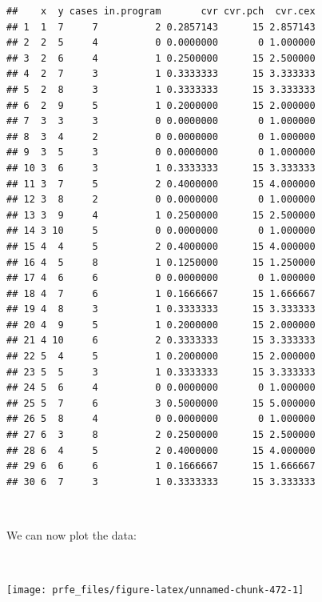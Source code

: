 \documentclass[12pt,a4paper]{book}
\newenvironment{Shaded}{\begin{snugshade}}{\end{snugshade}}
\newcommand{\DataTypeTok}[1]{\textcolor[rgb]{0.13,0.29,0.53}{#1}}
\newcommand{\KeywordTok}[1]{\textcolor[rgb]{0.13,0.29,0.53}{\textbf{#1}}}
\newcommand{\NormalTok}[1]{#1}
\newcommand{\OperatorTok}[1]{\textcolor[rgb]{0.81,0.36,0.00}{\textbf{#1}}}
\newcommand{\StringTok}[1]{\textcolor[rgb]{0.31,0.60,0.02}{#1}}
\theoremstyle{definition}
\theoremstyle{definition}
\theoremstyle{definition}
\theoremstyle{remark}
\begin{document}
\begin{verbatim}
##    x  y cases in.program       cvr cvr.pch  cvr.cex
## 1  1  7     7          2 0.2857143      15 2.857143
## 2  2  5     4          0 0.0000000       0 1.000000
## 3  2  6     4          1 0.2500000      15 2.500000
## 4  2  7     3          1 0.3333333      15 3.333333
## 5  2  8     3          1 0.3333333      15 3.333333
## 6  2  9     5          1 0.2000000      15 2.000000
## 7  3  3     3          0 0.0000000       0 1.000000
## 8  3  4     2          0 0.0000000       0 1.000000
## 9  3  5     3          0 0.0000000       0 1.000000
## 10 3  6     3          1 0.3333333      15 3.333333
## 11 3  7     5          2 0.4000000      15 4.000000
## 12 3  8     2          0 0.0000000       0 1.000000
## 13 3  9     4          1 0.2500000      15 2.500000
## 14 3 10     5          0 0.0000000       0 1.000000
## 15 4  4     5          2 0.4000000      15 4.000000
## 16 4  5     8          1 0.1250000      15 1.250000
## 17 4  6     6          0 0.0000000       0 1.000000
## 18 4  7     6          1 0.1666667      15 1.666667
## 19 4  8     3          1 0.3333333      15 3.333333
## 20 4  9     5          1 0.2000000      15 2.000000
## 21 4 10     6          2 0.3333333      15 3.333333
## 22 5  4     5          1 0.2000000      15 2.000000
## 23 5  5     3          1 0.3333333      15 3.333333
## 24 5  6     4          0 0.0000000       0 1.000000
## 25 5  7     6          3 0.5000000      15 5.000000
## 26 5  8     4          0 0.0000000       0 1.000000
## 27 6  3     8          2 0.2500000      15 2.500000
## 28 6  4     5          2 0.4000000      15 4.000000
## 29 6  6     6          1 0.1666667      15 1.666667
## 30 6  7     3          1 0.3333333      15 3.333333
\end{verbatim}

~

We can now plot the data:

~

\begin{Shaded}
\end{Shaded}

\begin{center}\texttt{[image: prfe\_files/figure-latex/unnamed-chunk-472-1]} \end{center}
\end{document}

